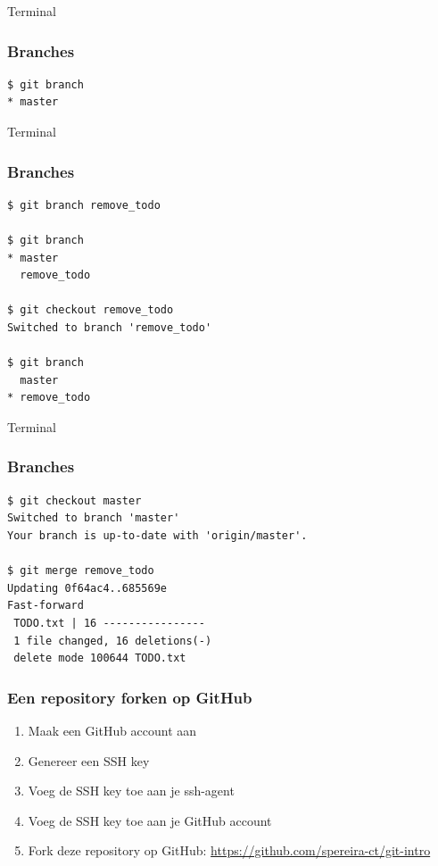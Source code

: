 \documentclass[]{beamer}
\begin{document}
\begin{frame}[fragile]
    \begin{block}{Terminal}
    \frametitle{Branches}

\begin{Verbatim}[fontsize=\scriptsize]
$ git branch
* master
\end{Verbatim}
    \end{block}
\end{frame}

\begin{frame}[fragile]
    \begin{block}{Terminal}
    \frametitle{Branches}

\begin{Verbatim}[fontsize=\scriptsize]
$ git branch remove_todo

$ git branch
* master
  remove_todo

$ git checkout remove_todo
Switched to branch 'remove_todo'

$ git branch
  master
* remove_todo
\end{Verbatim}
    \end{block}
\end{frame}

\begin{frame}[fragile]
    \begin{block}{Terminal}
    \frametitle{Branches}

\begin{Verbatim}[fontsize=\scriptsize]
$ git checkout master
Switched to branch 'master'
Your branch is up-to-date with 'origin/master'.

$ git merge remove_todo
Updating 0f64ac4..685569e
Fast-forward
 TODO.txt | 16 ----------------
 1 file changed, 16 deletions(-)
 delete mode 100644 TODO.txt
\end{Verbatim}
    \end{block}
\end{frame}

\begin{frame}
    \frametitle{Een repository forken op GitHub}

    \begin{enumerate}
        \item Maak een GitHub account aan
        \item Genereer een SSH key
        \item Voeg de SSH key toe aan je ssh-agent
        \item Voeg de SSH key toe aan je GitHub account
        \item Fork deze repository op GitHub: \url{https://github.com/spereira-ct/git-intro}
    \end{enumerate}
\end{frame}
\end{document}
